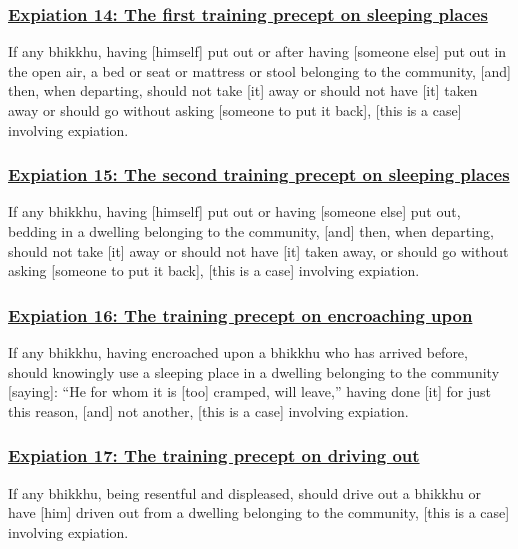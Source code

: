 \subsubsection*{\hyperref[pac14]{Expiation 14: The first training precept on sleeping places}}
\label{exp14}
If any bhikkhu, having [himself] put out or after having [someone else] put out in the open air, a bed or seat or mattress or stool belonging to the community, [and] then, when departing, should not take [it] away or should not have [it] taken away or should go without asking [someone to put it back], [this is a case] involving expiation.



\subsubsection*{\hyperref[pac15]{Expiation 15: The second training precept on sleeping places}}
\label{exp15}
If any bhikkhu, having [himself] put out or having [someone else] put out, bedding in a dwelling belonging to the community, [and] then, when departing, should not take [it] away or should not have [it] taken away, or should go without asking [someone to put it back], [this is a case] involving expiation.



\subsubsection*{\hyperref[pac16]{Expiation 16: The training precept on encroaching upon}}
\label{exp16}
If any bhikkhu, having encroached upon a bhikkhu who has arrived before, should knowingly use a sleeping place in a dwelling belonging to the community [saying]: ``He for whom it is [too] cramped, will leave,'' having done [it] for just this reason, [and] not another, [this is a case] involving expiation.



\subsubsection*{\hyperref[pac17]{Expiation 17: The training precept on driving out}}
\label{exp17}
If any bhikkhu, being resentful and displeased, should drive out a bhikkhu or have [him] driven out from a dwelling belonging to the community, [this is a case] involving expiation.




